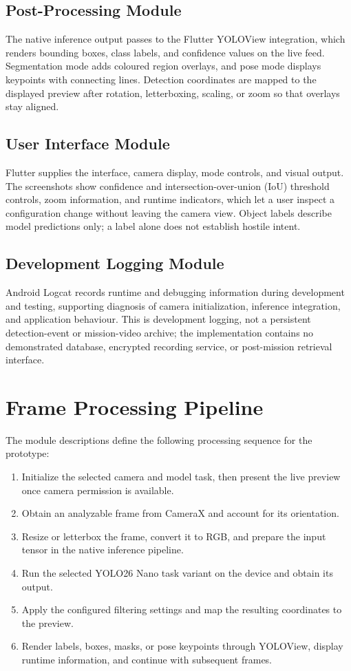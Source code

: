\subsection{Post-Processing Module}
The native inference output passes to the Flutter YOLOView integration, which renders bounding boxes,
class labels, and confidence values on the live feed. Segmentation mode adds coloured region
overlays, and pose mode displays keypoints with connecting lines. Detection coordinates are mapped to
the displayed preview after rotation, letterboxing, scaling, or zoom so that overlays stay aligned.

\subsection{User Interface Module}
Flutter supplies the interface, camera display, mode controls, and visual output. The screenshots show
confidence and intersection-over-union (IoU) threshold controls, zoom information, and runtime
indicators, which let a user inspect a configuration change without leaving the camera view. Object
labels describe model predictions only; a label alone does not establish hostile intent.

\subsection{Development Logging Module}
Android Logcat records runtime and debugging information during development and testing, supporting
diagnosis of camera initialization, inference integration, and application behaviour. This is
development logging, not a persistent detection-event or mission-video archive; the implementation
contains no demonstrated database, encrypted recording service, or post-mission retrieval interface.

\label{end:modules}
\section{Frame Processing Pipeline}\label{sec:pipeline}
The module descriptions define the following processing sequence for the prototype:
\begin{enumerate}
  \item Initialize the selected camera and model task, then present the live preview once camera
    permission is available.
  \item Obtain an analyzable frame from CameraX and account for its orientation.
  \item Resize or letterbox the frame, convert it to RGB, and prepare the input tensor in the
    native inference pipeline.
  \item Run the selected YOLO26 Nano task variant on the device and obtain its output.
  \item Apply the configured filtering settings and map the resulting coordinates to the preview.
  \item Render labels, boxes, masks, or pose keypoints through YOLOView, display runtime
    information, and continue with subsequent frames.
    \label{end:pipeline}
\end{enumerate}

